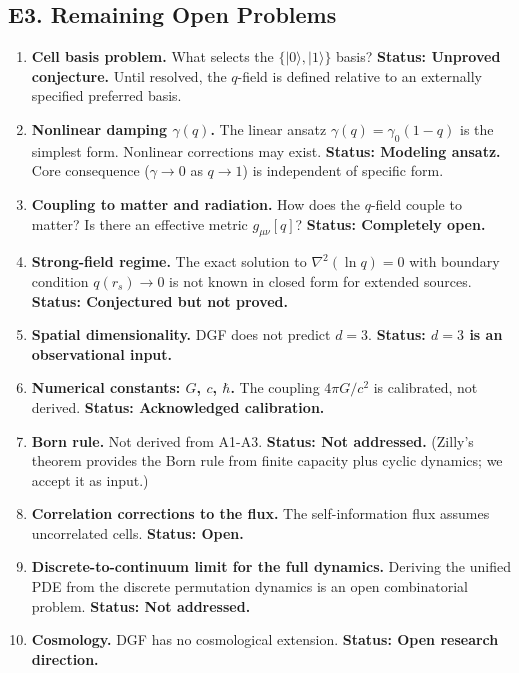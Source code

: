 \documentclass[reprint]{revtex4-2}
\begin{document}
\subsection{E3. Remaining Open Problems}

\begin{enumerate}[leftmargin=*, label=\textbf{OP-\arabic*:}]

\item \textbf{Cell basis problem.} What selects the $\{|0\rangle,|1\rangle\}$ basis? \textbf{Status: Unproved conjecture.} Until resolved, the $q$-field is defined relative to an externally specified preferred basis.

\item \textbf{Nonlinear damping $\gamma(q)$.} The linear ansatz $\gamma(q)=\gamma_0(1-q)$ is the simplest form. Nonlinear corrections may exist. \textbf{Status: Modeling ansatz.} Core consequence ($\gamma\to 0$ as $q\to 1$) is independent of specific form.

\item \textbf{Coupling to matter and radiation.} How does the $q$-field couple to matter? Is there an effective metric $g_{\mu\nu}[q]$? \textbf{Status: Completely open.}

\item \textbf{Strong-field regime.} The exact solution to $\nabla^2(\ln q)=0$ with boundary condition $q(r_s)\to 0$ is not known in closed form for extended sources. \textbf{Status: Conjectured but not proved.}

\item \textbf{Spatial dimensionality.} DGF does not predict $d=3$. \textbf{Status: $d=3$ is an observational input.}

\item \textbf{Numerical constants: $G$, $c$, $\hbar$.} The coupling $4\pi G/c^2$ is calibrated, not derived. \textbf{Status: Acknowledged calibration.}

\item \textbf{Born rule.} Not derived from A1-A3. \textbf{Status: Not addressed.} (Zilly's theorem provides the Born rule from finite capacity plus cyclic dynamics; we accept it as input.)

\item \textbf{Correlation corrections to the flux.} The self-information flux assumes uncorrelated cells. \textbf{Status: Open.}

\item \textbf{Discrete-to-continuum limit for the full dynamics.} Deriving the unified PDE from the discrete permutation dynamics is an open combinatorial problem. \textbf{Status: Not addressed.}

\item \textbf{Cosmology.} DGF has no cosmological extension. \textbf{Status: Open research direction.}

\end{enumerate}
\end{document}
